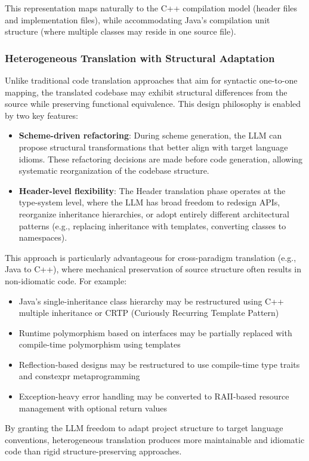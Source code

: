 This representation maps naturally to the C++ compilation model (header files and implementation files), while accommodating Java's compilation unit structure (where multiple classes may reside in one source file).

\subsubsection{Heterogeneous Translation with Structural Adaptation}

Unlike traditional code translation approaches that aim for syntactic one-to-one mapping, the translated codebase may exhibit structural differences from the source while preserving functional equivalence. This design philosophy is enabled by two key features:

\begin{itemize}
\item \textbf{Scheme-driven refactoring}: During scheme generation, the LLM can propose structural transformations that better align with target language idioms. These refactoring decisions are made before code generation, allowing systematic reorganization of the codebase structure.

\item \textbf{Header-level flexibility}: The Header translation phase operates at the type-system level, where the LLM has broad freedom to redesign APIs, reorganize inheritance hierarchies, or adopt entirely different architectural patterns (e.g., replacing inheritance with templates, converting classes to namespaces).
\end{itemize}

This approach is particularly advantageous for cross-paradigm translation (e.g., Java to C++), where mechanical preservation of source structure often results in non-idiomatic code. For example:
\begin{itemize}
\item Java's single-inheritance class hierarchy may be restructured using C++ multiple inheritance or CRTP (Curiously Recurring Template Pattern)
\item Runtime polymorphism based on interfaces may be partially replaced with compile-time polymorphism using templates
\item Reflection-based designs may be restructured to use compile-time type traits and constexpr metaprogramming
\item Exception-heavy error handling may be converted to RAII-based resource management with optional return values
\end{itemize}

By granting the LLM freedom to adapt project structure to target language conventions, heterogeneous translation produces more maintainable and idiomatic code than rigid structure-preserving approaches.
